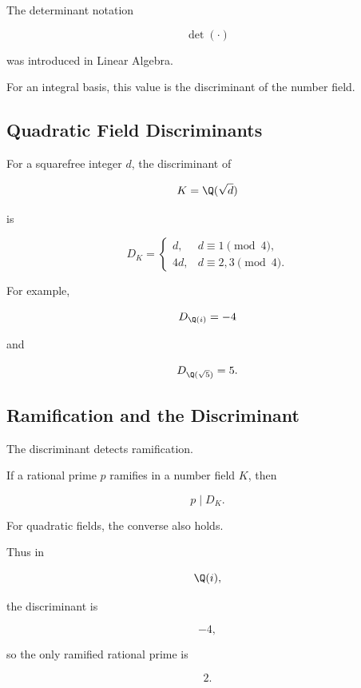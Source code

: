 The determinant notation

\[ \det(\cdot) \]

was introduced in Linear Algebra.

For an integral basis, this value is the discriminant of the number field.

\subsection{Quadratic Field Discriminants}
\label{subsec:quadratic-field-discriminants}

For a squarefree integer \(d\), the discriminant of

\[ K=\Q(\sqrt d) \]

is

\[
D_K=
\begin{cases}
d, & d\equiv1\pmod4,\\
4d, & d\equiv2,3\pmod4.
\end{cases}
\]

For example,

\[ D_{\Q(i)}=-4 \]

and

\[ D_{\Q(\sqrt5)}=5. \]

\subsection{Ramification and the Discriminant}
\label{subsec:ramification-discriminant}

The discriminant detects ramification.

\begin{theorem}
If a rational prime \(p\) ramifies in a number field \(K\), then

\[ p\mid D_K. \]
\end{theorem}

For quadratic fields, the converse also holds.

Thus in

\[ \Q(i), \]

the discriminant is

\[ -4, \]

so the only ramified rational prime is

\[ 2. \]

